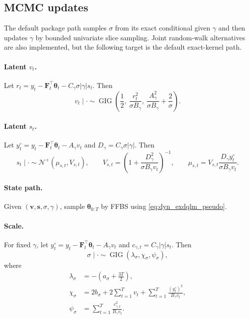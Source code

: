 \documentclass[nojss,noheadings]{jss}
\newcommand{\vect}[1]{\bm{#1}}
\newcommand{\mat}[1]{\mathbf{#1}}
\newcommand{\TNp}{\mathcal{N}^{+}}
\newcommand{\GIG}{\operatorname{GIG}}
\begin{document}
\subsection{MCMC updates}

The default package path samples $\sigma$ from its exact conditional
given $\gamma$ and then updates $\gamma$ by bounded univariate slice sampling.
Joint random-walk alternatives are also implemented, but the following target
is the default exact-kernel path.

\paragraph{Latent $v_t$.}
Let
$r_t=y_t-\mat{F}_t^\top\vect{\theta}_t-C_\gamma\sigma|\gamma|s_t$. Then
\begin{equation}
v_t\mid\cdot
\sim
\GIG\left(
\frac{1}{2},\
\frac{r_t^2}{\sigma B_\gamma},\
\frac{A_\gamma^2}{\sigma B_\gamma}+\frac{2}{\sigma}
\right).
\label{eq:dyn_exdqlm_v_cond}
\end{equation}

\paragraph{Latent $s_t$.}
Let $y_t^\circ=y_t-\mat{F}_t^\top\vect{\theta}_t-A_\gamma v_t$ and
$D_\gamma=C_\gamma\sigma|\gamma|$. Then
\begin{equation}
s_t\mid\cdot\sim\TNp(\mu_{s,t},V_{s,t}),
\qquad
V_{s,t}=\left(1+\frac{D_\gamma^2}{\sigma B_\gamma v_t}\right)^{-1},
\qquad
\mu_{s,t}=V_{s,t}\frac{D_\gamma y_t^\circ}{\sigma B_\gamma v_t}.
\label{eq:dyn_exdqlm_s_cond}
\end{equation}

\paragraph{State path.}
Given $(\vect{v},\vect{s},\sigma,\gamma)$, sample
$\vect{\theta}_{0:T}$ by FFBS using \eqref{eq:dyn_exdqlm_pseudo}.

\paragraph{Scale.}
For fixed $\gamma$, let $y_t^\circ=y_t-\mat{F}_t^\top\vect{\theta}_t-A_\gamma v_t$
and $c_{\gamma,t}=C_\gamma|\gamma|s_t$. Then
\begin{equation}
\sigma\mid\cdot
\sim
\GIG(\lambda_\sigma,\chi_\sigma,\psi_\sigma),
\label{eq:dyn_exdqlm_sigma_cond}
\end{equation}
where
\begin{align}
\lambda_\sigma &= -\left(a_\sigma+\frac{3T}{2}\right), \\
\chi_\sigma &= 2b_\sigma+2\sum_{t=1}^T v_t+
\sum_{t=1}^T\frac{(y_t^\circ)^2}{B_\gamma v_t},\\
\psi_\sigma &= \sum_{t=1}^T\frac{c_{\gamma,t}^2}{B_\gamma v_t}.
\end{align}
\end{document}
